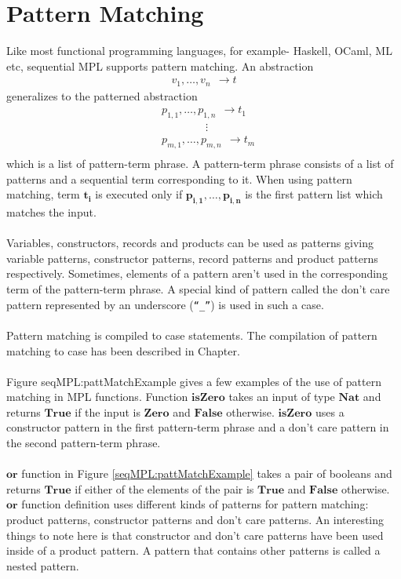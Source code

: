 \documentclass[11pt]{article}
\begin{document}
\section{Pattern Matching}\label {SeqMPL:IntPmatch}
Like most functional programming languages, for example- Haskell, OCaml, ML etc, sequential MPL supports pattern matching. An abstraction
\begin{align*}
  v_1,\ldots,v_n~~\to t 
\end{align*}
generalizes to the patterned abstraction
\begin{align*}
  &p_{1,1},\ldots,p_{1,n}~~\to t_1\\
  &\qquad \qquad\vdots \\
  &p_{m,1},\ldots,p_{m,n}~~\to t_m\\
\end{align*}
which is a list of pattern-term phrase. A pattern-term phrase consists of a list of patterns and a sequential term corresponding to it. When using pattern matching, term $\mathbf{t_i}$ is executed only if $\mathbf{p_{i,1},\ldots,p_{i,n}}$ is the first pattern list which matches the input.
~~\\~~\\
Variables, constructors, records and products can be used as patterns giving variable patterns, constructor patterns, record patterns and product patterns respectively. Sometimes, elements of a pattern aren't used in the corresponding term of the pattern-term phrase. A special kind of pattern called the don't care pattern represented by an underscore (\texttt{``\_''}) is used in such a case.  
~~\\~~\\
Pattern matching is compiled to {\sf case} statements. The compilation of pattern matching to case has been described in Chapter.
~~\\~~\\ 
Figure {seqMPL:pattMatchExample} gives a few examples of the use of pattern matching in MPL functions. Function $\mathbf{isZero}$ takes an input of type $\mathbf{Nat}$ and returns $\mathbf{True}$ if the input is $\mathbf{Zero}$ and $\mathbf{False}$ otherwise. $\mathbf{isZero}$ uses a constructor pattern in the first pattern-term phrase and a don't care pattern in the second pattern-term phrase.
~~\\~~\\ 
$\mathbf{or}$ function in Figure \ref{seqMPL:pattMatchExample} takes a pair of booleans and returns $\mathbf{True}$ if either of the elements of the pair is $\mathbf{True}$ and $\mathbf{False}$ otherwise. $\mathbf{or}$ function definition uses different kinds of patterns for pattern matching: product patterns, constructor patterns and don't care patterns. An interesting things to note here is that constructor and don't care patterns have been used inside of a product pattern. A pattern that contains other patterns is called a nested pattern. 
\end{document}

